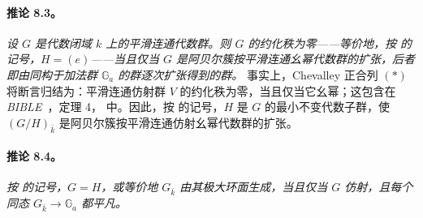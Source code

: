 \paragraph{\textbf{推论 8.3。}}
\emph{设 \(G\) 是代数闭域 \(k\) 上的平滑连通代数群。则 \(G\) 的约化秩为零——等价地，按  的记号，\(H=(e)\)——当且仅当 \(G\) 是阿贝尔簇按平滑连通幺幂代数群的扩张，后者即由同构于加法群 \(\mathbb G_a\) 的群逐次扩张得到的群。}
事实上，Chevalley 正合列 \((*)\) 将断言归结为：平滑连通仿射群 \(V\) 的约化秩为零，当且仅当它幺幂；这包含在\emph{BIBLE}~，定理 4， 中。因此，按  的记号，\(H\) 是 \(G\) 的最小不变代数子群，使 \((G/H)_{\bar k}\) 是阿贝尔簇按平滑连通仿射幺幂代数群的扩张。
\paragraph{\textbf{推论 8.4。}}
\emph{按  的记号，\(G=H\)，或等价地 \(G_{\bar k}\) 由其极大环面生成，当且仅当 \(G\) 仿射，且每个同态 \(G_{\bar k}\to\mathbb G_a\) 都平凡。}

